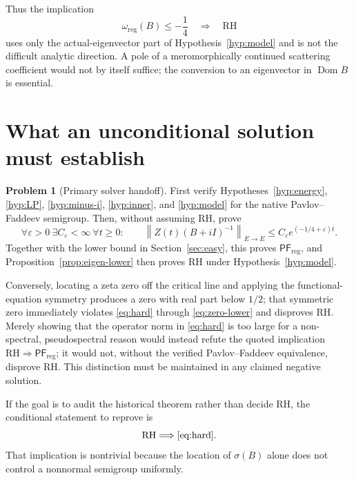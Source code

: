 \documentclass[11pt]{amsart}
\theoremstyle{definition}
\newtheorem{problem}[theorem]{Problem}
\theoremstyle{remark}
\DeclareMathOperator{\Dom}{Dom}
\newcommand{\norm}[1]{\left\lVert #1\right\rVert}
\newcommand{\eps}{\varepsilon}
\begin{document}
Thus the implication
\[
 \omega_{\mathrm{reg}}(B)\leq-\frac14
 \quad\Longrightarrow\quad\mathrm{RH}
\]
uses only the actual-eigenvector part of Hypothesis~\ref{hyp:model} and is not
the difficult analytic direction.  A pole of a meromorphically continued
scattering coefficient would not by itself suffice; the conversion to an
eigenvector in $\Dom B$ is essential.

\section{What an unconditional solution must establish}\label{sec:hard}

\begin{problem}[Primary solver handoff]\label{prob:primary}
First verify Hypotheses~\ref{hyp:energy}, \ref{hyp:LP},
\ref{hyp:minus-i}, \ref{hyp:inner}, and \ref{hyp:model} for the native
Pavlov--Faddeev semigroup.  Then, without assuming RH, prove
\begin{equation}\label{eq:hard}
 \forall\eps>0\ \exists C_{\eps}<\infty\ \forall t\geq0:
 \qquad
 \norm{Z(t)(B+iI)^{-1}}_{E\to E}
 \leq C_{\eps}e^{(-1/4+\eps)t}.
\end{equation}
Together with the lower bound in Section~\ref{sec:easy}, this proves
$\mathsf{PF}_{\mathrm{reg}}$, and Proposition~\ref{prop:eigen-lower} then
proves RH under Hypothesis~\ref{hyp:model}.
\end{problem}

Conversely, locating a zeta zero off the critical line and applying the
functional-equation symmetry produces a zero with real part below $1/2$;
that symmetric zero immediately violates \eqref{eq:hard} through
\eqref{eq:zero-lower} and disproves RH.  Merely showing
that the operator norm in \eqref{eq:hard} is too large for a non-spectral,
pseudospectral reason would instead refute the quoted implication
$\mathrm{RH}\Rightarrow\mathsf{PF}_{\mathrm{reg}}$; it would not, without the
verified Pavlov--Faddeev equivalence, disprove RH.  This distinction must be
maintained in any claimed negative solution.

If the goal is to audit the historical theorem rather than decide RH, the
conditional statement to reprove is
\begin{equation}\label{eq:conditional-hard}
 \mathrm{RH}\Longrightarrow\eqref{eq:hard}.
\end{equation}
That implication is nontrivial because the location of $\sigma(B)$ alone does
not control a nonnormal semigroup uniformly.
\end{document}
